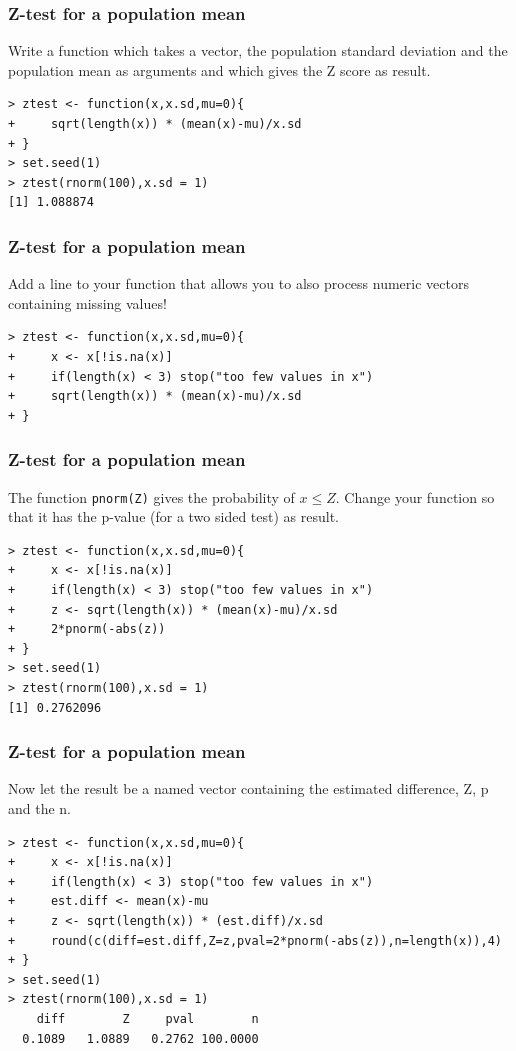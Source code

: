 \documentclass[xcolor={table}]{beamer}
\begin{document}
\begin{frame}[fragile]\frametitle{Z-test for a population mean}
Write a function which takes a vector, the population standard deviation and the population mean as arguments and which gives the Z score as result.
\begin{verbatim}
> ztest <- function(x,x.sd,mu=0){
+     sqrt(length(x)) * (mean(x)-mu)/x.sd
+ }
> set.seed(1)
> ztest(rnorm(100),x.sd = 1)
[1] 1.088874
\end{verbatim}
\end{frame}

\begin{frame}[fragile]\frametitle{Z-test for a population mean}
Add a line to your function that allows you to also process numeric vectors containing missing values!
\begin{verbatim}
> ztest <- function(x,x.sd,mu=0){
+     x <- x[!is.na(x)]
+     if(length(x) < 3) stop("too few values in x")
+     sqrt(length(x)) * (mean(x)-mu)/x.sd
+ }
\end{verbatim}
\end{frame}

\begin{frame}[fragile]\frametitle{Z-test for a population mean}
The function \texttt{pnorm(Z)} gives the probability of $x \leq Z $. Change your function so that it has the p-value (for a two sided test) as result. 
\begin{verbatim}
> ztest <- function(x,x.sd,mu=0){
+     x <- x[!is.na(x)]
+     if(length(x) < 3) stop("too few values in x")
+     z <- sqrt(length(x)) * (mean(x)-mu)/x.sd
+     2*pnorm(-abs(z))
+ }
> set.seed(1)
> ztest(rnorm(100),x.sd = 1)
[1] 0.2762096
\end{verbatim}
\end{frame}


\begin{frame}[fragile]\frametitle{Z-test for a population mean}
Now let the result be a named vector containing the estimated difference, Z, p and the n.
\begin{verbatim}
> ztest <- function(x,x.sd,mu=0){
+     x <- x[!is.na(x)]
+     if(length(x) < 3) stop("too few values in x")
+     est.diff <- mean(x)-mu
+     z <- sqrt(length(x)) * (est.diff)/x.sd
+     round(c(diff=est.diff,Z=z,pval=2*pnorm(-abs(z)),n=length(x)),4)
+ }
> set.seed(1)
> ztest(rnorm(100),x.sd = 1)
    diff        Z     pval        n 
  0.1089   1.0889   0.2762 100.0000 

\end{verbatim}
\end{frame}
\end{document}
